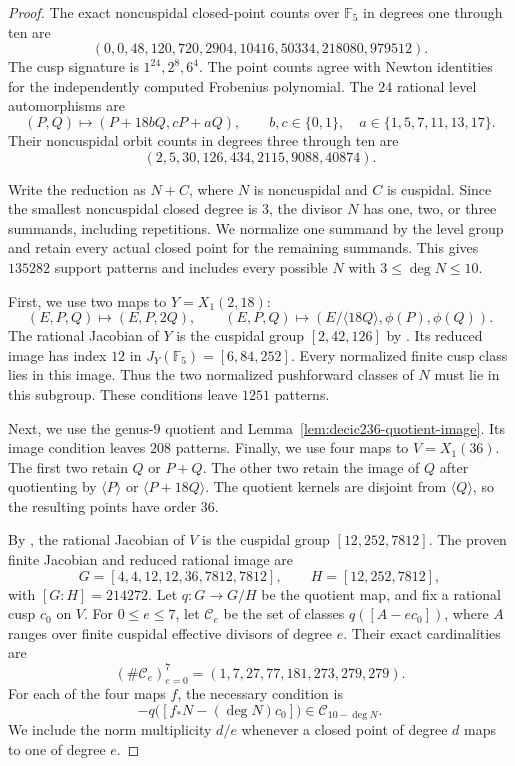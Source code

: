 \begin{proof}
The exact noncuspidal closed-point counts over $\mathbb F_5$ in
degrees one through ten are
\[
 (0,0,48,120,720,2904,10416,50334,218080,979512).
\]
The cusp signature is $1^{24},2^8,6^4$.
The point counts agree with Newton identities for the independently
computed Frobenius polynomial.
The $24$ rational level automorphisms are
\[
 (P,Q)\longmapsto(P+18bQ,cP+aQ),\qquad
 b,c\in\{0,1\},\quad a\in\{1,5,7,11,13,17\}.
\]
Their noncuspidal orbit counts in degrees three through ten are
\[
 (2,5,30,126,434,2115,9088,40874).
\]

Write the reduction as $N+C$, where $N$ is noncuspidal and
$C$ is cuspidal. Since the smallest noncuspidal closed degree is
$3$, the divisor $N$ has one, two, or three summands, including
repetitions. We normalize one summand by the level group and
retain every actual closed point for the remaining summands.
This gives $135282$ support patterns and includes every possible
$N$ with $3\leq\deg N\leq10$.

First, we use two maps to $Y=X_1(2,18)$:
\[
 (E,P,Q)\longmapsto(E,P,2Q),\qquad
 (E,P,Q)\longmapsto
 (E/\langle18Q\rangle,\phi(P),\phi(Q)).
\]
The rational Jacobian of $Y$ is the cuspidal group
$[2,42,126]$ by \cite[Proposition~4.16 and Table~3]{DEHMZ}.
Its reduced image has index $12$ in
$J_Y(\mathbb F_5)=[6,84,252]$.
Every normalized finite cusp class lies in this image.
Thus the two normalized pushforward classes of $N$ must lie in
this subgroup. These conditions leave $1251$ patterns.

Next, we use the genus-$9$ quotient and
Lemma~\ref{lem:decic236-quotient-image}.
Its image condition leaves $208$ patterns.
Finally, we use four maps to $V=X_1(36)$.
The first two retain $Q$ or $P+Q$.
The other two retain the image of $Q$ after quotienting by
$\langle P\rangle$ or $\langle P+18Q\rangle$.
The quotient kernels are disjoint from $\langle Q\rangle$, so
the resulting points have order $36$.

By \cite[Theorem~4.13 and Table~2]{DEHMZ}, the rational
Jacobian of $V$ is the cuspidal group $[12,252,7812]$.
The proven finite Jacobian and reduced rational image are
\[
 G=[4,4,12,12,36,7812,7812],\qquad H=[12,252,7812],
\]
with $[G:H]=214272$.
Let $q:G\to G/H$ be the quotient map, and fix a rational cusp
$c_0$ on $V$. For $0\leq e\leq7$, let $\mathcal C_e$ be the
set of classes $q([A-ec_0])$, where $A$ ranges over finite
cuspidal effective divisors of degree $e$.
Their exact cardinalities are
\[
 (\#\mathcal C_e)_{e=0}^7=(1,7,27,77,181,273,279,279).
\]
For each of the four maps $f$, the necessary condition is
\[
 -q\bigl([f_*N-(\deg N)c_0]\bigr)\in\mathcal C_{10-\deg N}.
\]
We include the norm multiplicity $d/e$ whenever a closed point of
degree $d$ maps to one of degree $e$.


\end{proof}
